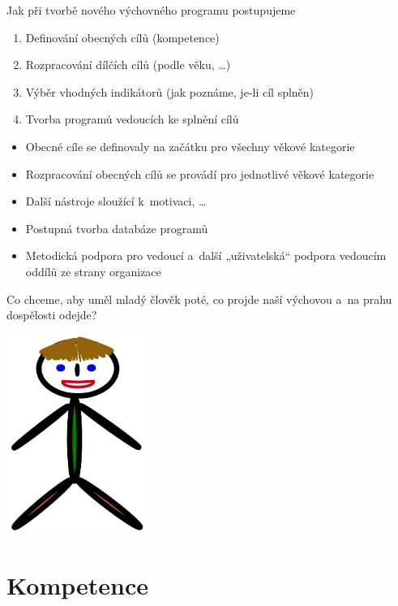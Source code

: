 \documentclass[compress,xelatex,xcolor=dvipsnames,print]{beamer}
\begin{document}
\begin{frame}{Jak při tvorbě nového výchovného programu postupujeme}
\begin{enumerate}
\item Definování obecných cílů (kompetence)
\item Rozpracování dílčích cílů (podle věku, \ldots)
\item Výběr vhodných indikátorů (jak poznáme, je-li cíl splněn)
\item Tvorba programů vedoucích ke splnění cílů
\end{enumerate}
\begin{itemize}
\item Obecné cíle se definovaly na začátku pro všechny věkové kategorie
\item Rozpracování obecných cílů se provádí pro jednotlivé věkové kategorie
\item Další nástroje sloužící k~motivaci, \ldots
\item Postupná tvorba databáze programů
\item Metodická podpora pro vedoucí a~další „uživatelská“ podpora vedoucím oddílů ze strany organizace
\end{itemize}
\end{frame}

\begin{frame}{Co chceme, aby uměl mladý člověk poté, co projde naší výchovou a~na prahu dospělosti odejde?}
\begin{center}
\includegraphics[height=6.5cm]{pepicek.png}
\end{center}
\end{frame}

\section{Kompetence}
\end{document}
